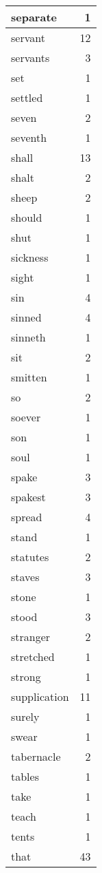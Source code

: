 \begin{center}
\begin{longtable}{l|r}
separate & 1 \\ \hline
servant & 12 \\ \hline
servants & 3 \\ \hline
set & 1 \\ \hline
settled & 1 \\ \hline
seven & 2 \\ \hline
seventh & 1 \\ \hline
shall & 13 \\ \hline
shalt & 2 \\ \hline
sheep & 2 \\ \hline
should & 1 \\ \hline
shut & 1 \\ \hline
sickness & 1 \\ \hline
sight & 1 \\ \hline
sin & 4 \\ \hline
sinned & 4 \\ \hline
sinneth & 1 \\ \hline
sit & 2 \\ \hline
smitten & 1 \\ \hline
so & 2 \\ \hline
soever & 1 \\ \hline
son & 1 \\ \hline
soul & 1 \\ \hline
spake & 3 \\ \hline
spakest & 3 \\ \hline
spread & 4 \\ \hline
stand & 1 \\ \hline
statutes & 2 \\ \hline
staves & 3 \\ \hline
stone & 1 \\ \hline
stood & 3 \\ \hline
stranger & 2 \\ \hline
stretched & 1 \\ \hline
strong & 1 \\ \hline
supplication & 11 \\ \hline
surely & 1 \\ \hline
swear & 1 \\ \hline
tabernacle & 2 \\ \hline
tables & 1 \\ \hline
take & 1 \\ \hline
teach & 1 \\ \hline
tents & 1 \\ \hline
that & 43 \\ \hline

\end{longtable}
\end{center}
